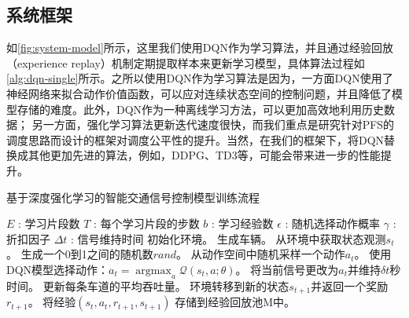\subsection{系统框架}
如\autoref{fig:system-model}所示，这里我们使用DQN作为学习算法，并且通过经验回放\cite{mnih2015human}（experience replay）机制定期提取样本来更新学习模型，具体算法过程如\autoref{alg:dqn-single}所示。之所以使用DQN作为学习算法是因为，一方面DQN使用了神经网络来拟合动作价值函数，可以应对连续状态空间的控制问题，并且降低了模型存储的难度。此外，DQN作为一种离线学习方法，可以更加高效地利用历史数据；
另一方面，强化学习算法更新迭代速度很快，而我们重点是研究针对PFS的调度思路而设计的框架对调度公平性的提升。当然，在我们的框架下，将DQN替换成其他更加先进的算法，例如，DDPG、TD3等，可能会带来进一步的性能提升。

\begin{breakablealgorithm}
    \caption{基于深度强化学习的智能交通信号控制模型训练流程}
    \label{alg:dqn-single}
    \begin{algorithmic}[1] %
        \Require 
        $E$ : 学习片段数 \newline
        $T$ : 每个学习片段的步数 \newline
        $b$ : 学习经验数 \newline
        $\epsilon$ : 随机选择动作概率 \newline
        $\gamma$ : 折扣因子 \newline
        $\Delta t$ : 信号维持时间
            \State 初始化环境。
            \State 生成车辆。
                \State 从环境中获取状态观测$s_t$。
                \State 生成一个0到1之间的随机数$rand$。
                    \State 从动作空间中随机采样一个动作$a_t$。
                \Else
                    \State 使用DQN模型选择动作：$a_t = \mathop{\arg\max}_a \mathcal{Q}(s_t,a;\theta)$。
                \EndIf
                \State 将当前信号更改为$a_t$并维持$\delta t$秒时间。
                \State 更新每条车道的平均吞吐量。
                \State 环境转移到新的状态$s_{t+1}$并返回一个奖励$r_{t+1}$。
                \State 将经验$(s_t,a_t,r_{t+1},s_{t+1})$ 存储到经验回放池M中。
                \EndIf
            \EndFor
        \EndFor  
    \end{algorithmic}  
\end{breakablealgorithm}  

